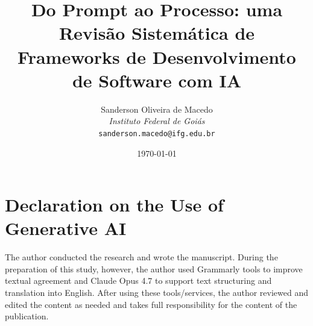 \documentclass[11pt,a4paper]{article}
\title{Do Prompt ao Processo: uma Revisão Sistemática de Frameworks de Desenvolvimento de Software com IA}
\author{Sanderson Oliveira de Macedo\\
\textit{Instituto Federal de Goiás}\\
\texttt{sanderson.macedo@ifg.edu.br}}
\date{\today}
\begin{document}
\maketitle













\section*{Declaration on the Use of Generative AI}

The author conducted the research and wrote the manuscript. During the preparation of this study, however, the author used Grammarly tools to improve textual agreement and Claude Opus 4.7 to support text structuring and translation into English. After using these tools/services, the author reviewed and edited the content as needed and takes full responsibility for the content of the publication.



\end{document}

